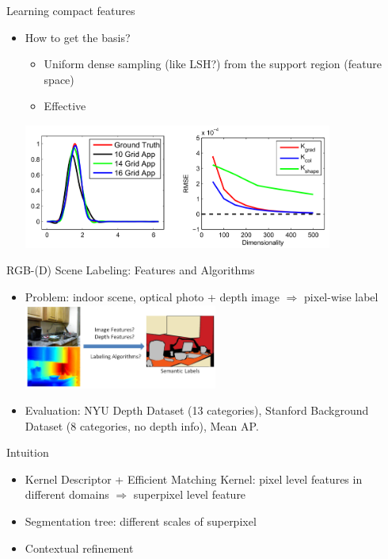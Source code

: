 \documentclass[12pt]{beamer}
\begin{document}
\begin{frame}{Learning compact features}
    \begin{itemize}
        \item How to get the basis?
        \begin{itemize}
            \item Uniform dense sampling (like LSH?) from the support region (feature space)
            \item Effective
        \end{itemize}
        \includegraphics[width=0.8\textwidth]{kernel2.png}
    \end{itemize}
\end{frame}

\begin{frame}{RGB-(D) Scene Labeling: Features and Algorithms}
	\begin{itemize}
		\item Problem: indoor scene, optical photo + depth image $\Rightarrow$ pixel-wise label \\
		\medskip
		\includegraphics[width=0.5\textwidth]{fig1.png} \\
		\item Evaluation: NYU Depth Dataset (13 categories), Stanford Background Dataset (8 categories, no depth info), Mean AP.
	\end{itemize}
\end{frame}

\begin{frame}{Intuition}
	\begin{itemize}
		\item Kernel Descriptor + Efficient Matching Kernel: pixel level features in different domains $\Rightarrow$ superpixel level feature
		\item Segmentation tree: different scales of superpixel
		\item Contextual refinement
	\end{itemize}
\end{frame}
\end{document}

